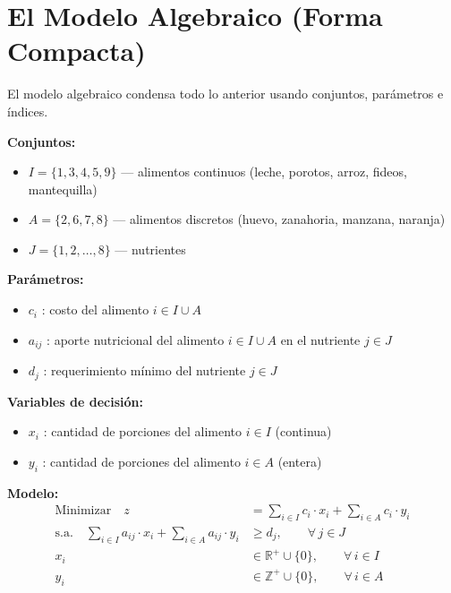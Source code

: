 \documentclass[12pt]{article}
\begin{document}
\section{El Modelo Algebraico (Forma Compacta)}

El modelo algebraico condensa todo lo anterior usando conjuntos, par\'ametros e \'indices.

\begin{mdframed}[backgroundcolor=gray!5, linewidth=1.5pt]
\textbf{Conjuntos:}
\begin{itemize}
    \item $I = \{1, 3, 4, 5, 9\}$ --- alimentos continuos (leche, porotos, arroz, fideos, mantequilla)
    \item $A = \{2, 6, 7, 8\}$ --- alimentos discretos (huevo, zanahoria, manzana, naranja)
    \item $J = \{1, 2, \ldots, 8\}$ --- nutrientes
\end{itemize}

\medskip
\textbf{Par\'ametros:}
\begin{itemize}
    \item $c_i$ : costo del alimento $i \in I \cup A$
    \item $a_{ij}$ : aporte nutricional del alimento $i \in I \cup A$ en el nutriente $j \in J$
    \item $d_j$ : requerimiento m\'inimo del nutriente $j \in J$
\end{itemize}

\medskip
\textbf{Variables de decisi\'on:}
\begin{itemize}
    \item $x_i$ : cantidad de porciones del alimento $i \in I$ (continua)
    \item $y_i$ : cantidad de porciones del alimento $i \in A$ (entera)
\end{itemize}

\bigskip
\textbf{Modelo:}
\begin{align}
    \text{Minimizar}\quad z &= \sum_{i \in I} c_i \cdot x_i + \sum_{i \in A} c_i \cdot y_i \tag{2.96} \\[10pt]
    \text{s.a.}\quad \sum_{i \in I} a_{ij} \cdot x_i + \sum_{i \in A} a_{ij} \cdot y_i &\geq d_j, \qquad \forall\, j \in J \tag{2.97} \\[10pt]
    x_i &\in \mathbb{R}^+ \cup \{0\}, \qquad \forall\, i \in I \tag{2.98} \\[10pt]
    y_i &\in \mathbb{Z}^+ \cup \{0\}, \qquad \forall\, i \in A \tag{2.99}
\end{align}
\end{mdframed}
\end{document}
